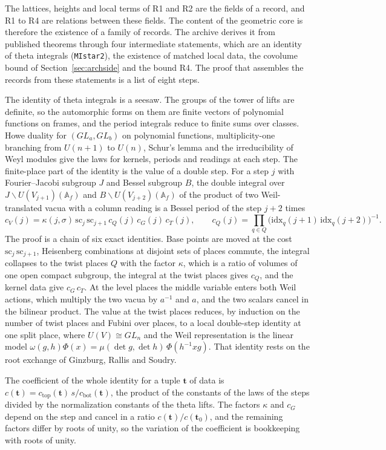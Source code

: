 \documentclass[11pt,letterpaper]{article}
\numberwithin{equation}{section}
\begin{document}
The lattices, heights and local terms of R1 and R2 are the fields of a record, and R1 to R4 are relations between these fields. The content of the geometric core is therefore the existence of a family of records. The archive derives it from published theorems through four intermediate statements, which are an identity of theta integrals (\texttt{MIstar2}), the existence of matched local data, the covolume bound of Section~\ref{sec:archside} and the bound R4. The proof that assembles the records from these statements is a list of eight steps.

The identity of theta integrals is a seesaw. The groups of the tower of lifts are definite, so the automorphic forms on them are finite vectors of polynomial functions on frames, and the period integrals reduce to finite sums over classes. Howe duality for $(GL_a,GL_b)$ on polynomial functions, multiplicity-one branching from $U(n+1)$ to $U(n)$, Schur's lemma and the irreducibility of Weyl modules give the laws for kernels, periods and readings at each step. The finite-place part of the identity is the value of a double step. For a step $j$ with Fourier--Jacobi subgroup $J$ and Bessel subgroup $B$, the double integral over $J\backslash U(V_{j+1})(\mathbb A_f)$ and $B\backslash U(V_{j+2})(\mathbb A_f)$ of the product of two Weil-translated vacua with a column reading is a Bessel period of the step $j+2$ times
\[
c_V(j)=\kappa(j,\sigma)\,\mathrm{sc}_j\,\mathrm{sc}_{j+1}\,c_Q(j)\,c_G(j)\,c_T(j),\qquad c_Q(j)=\prod_{q\in Q}\big(\mathrm{idx}_q(j+1)\,\mathrm{idx}_q(j+2)\big)^{-1}.
\]
The proof is a chain of six exact identities. Base points are moved at the cost $\mathrm{sc}_j\,\mathrm{sc}_{j+1}$, Heisenberg combinations at disjoint sets of places commute, the integral collapses to the twist places $Q$ with the factor $\kappa$, which is a ratio of volumes of one open compact subgroup, the integral at the twist places gives $c_Q$, and the kernel data give $c_G\,c_T$. At the level places the middle variable enters both Weil actions, which multiply the two vacua by $a^{-1}$ and $a$, and the two scalars cancel in the bilinear product. The value at the twist places reduces, by induction on the number of twist places and Fubini over places, to a local double-step identity at one split place, where $U(V)\cong GL_n$ and the Weil representation is the linear model $\omega(g,h)\Phi(x)=\mu(\det g,\det h)\,\Phi(h^{-1}xg)$. That identity rests on the root exchange of Ginzburg, Rallis and Soudry.

The coefficient of the whole identity for a tuple $\mathbf t$ of data is $c(\mathbf t)=c_{\mathrm{top}}(\mathbf t)\,s/c_{\mathrm{bot}}(\mathbf t)$, the product of the constants of the laws of the steps divided by the normalization constants of the theta lifts. The factors $\kappa$ and $c_G$ depend on the step and cancel in a ratio $c(\mathbf t)/c(\mathbf t_0)$, and the remaining factors differ by roots of unity, so the variation of the coefficient is bookkeeping with roots of unity.
\end{document}
